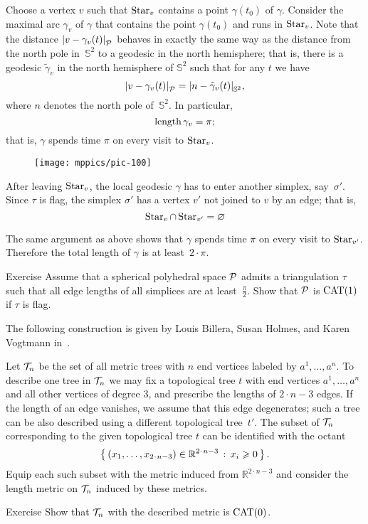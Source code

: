 Choose a vertex $v$ such that $\mathop{\rm Star}\nolimits_v$ contains a point $\gamma(t_0)$ of $\gamma$.
Consider the maximal arc $\gamma_v$ of $\gamma$ 
that contains the point $\gamma(t_0)$
and runs in $\mathop{\rm Star}\nolimits_v$.
Note that the distance $\dist{v}{\gamma_v(t)}{\spc{P}}$ behaves in exactly the same way 
as the distance from the north pole in~$\mathbb{S}^2$ to a geodesic in the north hemisphere;
that is, there is a geodesic $\tilde\gamma_v$ in the north hemisphere of $\mathbb{S}^2$ such that for any $t$ we have
\[\dist{v}{\gamma_v(t)}{\spc{P}}
=
\dist{n}{\tilde\gamma_v(t)}{\mathbb{S}^2},\]
where $n$ denotes the north pole of~$\mathbb{S}^2$.
In particular, 
\[\mathop{\rm length}\nolimits\gamma_v=\pi;\]
that is, $\gamma$ spends time $\pi$ on every visit to $\mathop{\rm Star}\nolimits_v$.


\begin{wrapfigure}{r}{45mm}
\vskip0mm
\centering
\texttt{[image: mppics/pic-100]}
\end{wrapfigure}

After leaving $\mathop{\rm Star}\nolimits_v$,
the local geodesic $\gamma$ has to enter another simplex, 
say~$\sigma'$.
Since $\tau$ is flag, the simplex $\sigma'$
has a vertex $v'$ not joined to $v$ by an edge;
that is, 
\[\mathop{\rm Star}\nolimits_v\cap\mathop{\rm Star}\nolimits_{v'}=\varnothing\]

The same argument as above shows that $\gamma$ spends time $\pi$ on every visit to $\mathop{\rm Star}\nolimits_{v'}$.
Therefore the total length of $\gamma$ is at least~$2\cdot\pi$.
\qeds

\begin{thm}{Exercise}\label{ex:flag>=pi/2}
Assume that a spherical polyhedral space $\mathcal{P}$
admits a triangulation $\tau$ such that all edge lengths of all simplices are at least~$\tfrac\pi2$.
Show that $\mathcal{P}$ is $\mathrm{CAT}(1)$
if $\tau$ is flag.
\end{thm}

The following construction is given by
Louis Billera,
Susan Holmes,
and  Karen Vogtmann in~\cite{billera-holmes-vogtmann}.

Let $\mathcal{T}_n$ be the set of all metric trees with 
$n$ end vertices
labeled by $a^1,\dots,a^n$.
To describe one tree in $\mathcal{T}_n$ we may fix a topological tree $t$ with end vertices $a^1,\dots,a^n$ 
and all  other vertices of degree 3,  
and prescribe the lengths of $2\cdot n-3$ edges.
If the length of an edge vanishes, we assume that this edge degenerates;
such a tree can be also described using a different topological tree~$t'$.
The subset of $\mathcal{T}_n$ corresponding to the given topological tree $t$ can be identified with the octant
\[\set{(x_1,\dots,x_{2\cdot n-3})\in\mathbb{R}^{2\cdot n-3}}{x_i\ge 0}.\]
Equip each such subset with the metric induced from $\mathbb{R}^{2\cdot n-3}$ and consider the length metric on $\mathcal{T}_n$ induced by these metrics.

\begin{thm}{Exercise}\label{ex:tree}
Show that $\mathcal{T}_n$ with the described metric is $\mathrm{CAT}(0)$.
\end{thm}



